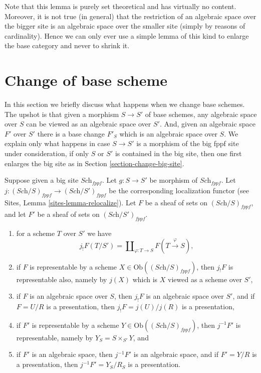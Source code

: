 \noindent
Note that this lemma is purely set theoretical and has virtually no content.
Moreover, it is not true (in general) that the restriction of an algebraic
space over the bigger site is an algebraic space over the smaller site (simply
by reasons of cardinality). Hence we can only ever use a simple lemma of this
kind to enlarge the base category and never to shrink it.


\section{Change of base scheme}
\label{section-change-base-scheme}

\noindent
In this section we briefly discuss what happens when we change base schemes.
The upshot is that given a morphism $S \to S'$ of base schemes, any algebraic
space over $S$ can be viewed as an algebraic space over $S'$. And, given an
algebraic space $F'$ over $S'$ there is a base change $F'_S$ which is
an algebraic space over $S$.
We explain only what happens in case $S \to S'$ is a morphism of the
big fppf site under consideration, if only $S$ or $S'$ is contained in the
big site, then one first enlarges the big site as in
Section \ref{section-change-big-site}.

\begin{lemma}
\label{lemma-change-base-scheme}
Suppose given a big site $\textit{Sch}_{fppf}$.
Let $g : S \to S'$ be morphism of $\textit{Sch}_{fppf}$.
Let $j : (\textit{Sch}/S)_{fppf} \to (\textit{Sch}/S')_{fppf}$ be
the corresponding localization functor (see
Sites, Lemma \ref{sites-lemma-relocalize}).
Let $F$ be a sheaf of sets on $(\textit{Sch}/S)_{fppf}$, and
let $F'$ be a sheaf of sets on $(\textit{Sch}/S')_{fppf}$.
\begin{enumerate}
\item for a scheme $T$ over $S'$ we have
$$
j_!F(T/S') =
\coprod\nolimits_{\varphi : T \to S} F(T \xrightarrow{\varphi} S),
$$
\item if $F$ is representable by a scheme
$X \in \text{Ob}((\textit{Sch}/S)_{fppf})$,
then $j_!F$ is representable also, namely by $j(X)$ which is
$X$ viewed as a scheme over $S'$,
\item if $F$ is an algebraic space over $S$, then $j_!F$ is an algebraic
space over $S'$, and if $F = U/R$ is a presentation, then
$j_!F = j(U)/j(R)$ is a presentation,
\item if $F'$ is representable by a scheme
$Y \in \text{Ob}((\textit{Sch}/S)_{fppf})$, then
$j^{-1}F'$ is representable, namely by $Y_S = S \times_{S'} Y$, and
\item if $F'$ is an algebraic space, then
$j^{-1}F'$ is an algebraic space, and if $F' = Y/R$ is a presentation,
then $j^{-1}F' = Y_S/R_S$ is a presentation.
\end{enumerate}
\end{lemma}

